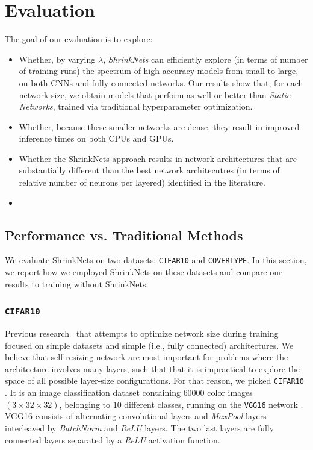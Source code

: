 \section{Evaluation}

The goal of our evaluation is to explore:
\begin{itemize}
	\item
Whether, by varying $\lambda$, \textit{ShrinkNets} can efficiently explore (in terms of number of training runs)  the spectrum of high-accuracy models from small to large, on both CNNs and fully connected networks.  Our results show that, for each network size, we obtain models that perform as well or better than 
\textit{Static Networks}, trained via traditional hyperparameter optimization.

\item Whether, because these  smaller networks are dense, they result in improved inference times on both CPUs and GPUs.

\item Whether the ShrinkNets approach results in network architectures that are substantially different than the best network architecutres (in terms of relative number of neurons per layered) identified in the literature.

\item {}
\end{itemize}

\subsection{Performance vs. Traditional Methods}

We evaluate ShrinkNets on two datasets:  \texttt{CIFAR10} and \texttt{COVERTYPE}.  In this section, we report how we employed ShrinkNets on these datasets and compare our results to 
training without ShrinkNets.

\subsubsection{\texttt{CIFAR10}}

Previous research~\cite{Scardapane2017} that attempts to optimize network size during training
 focused on simple datasets and simple (i.e., fully connected)
architectures. We believe that self-resizing
network are most important for problems where the architecture 
involves many layers, such that that it is impractical to explore the space of all possible
layer-size configurations. For that reason, we picked \texttt{CIFAR10} \cite{Krizhevsky2009}. It is an
image classification dataset containing $60000$ color images $(3 \times 32
\times 32)$, belonging to $10$ different classes, running on  the \texttt{VGG16} network \cite{Srivastava2014}. VGG16
consists of alternating convolutional layers and \textit{MaxPool} layers
interleaved by \textit{BatchNorm} \cite{DBLP:journals/corr/IoffeS15} and
\textit{ReLU} \cite{Nair2010}  layers. The two last layers are fully connected
layers separated by a \textit{ReLU} activation function.


